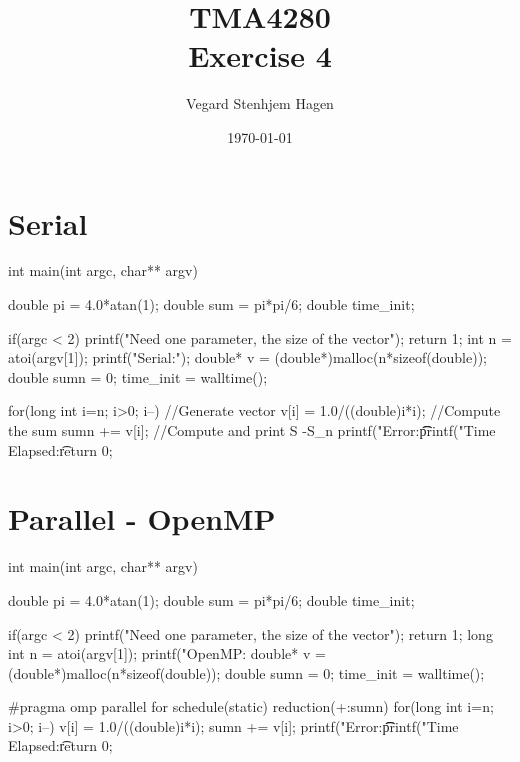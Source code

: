 \documentclass[11pt,a4paper,english]{article}
\title{TMA4280\\Exercise 4}
\author{Vegard Stenhjem Hagen}
\date{\today}
\begin{document}

\maketitle

\section{Serial}

\begin{ccode}
int main(int argc, char** argv){
    double pi = 4.0*atan(1);
    double sum = pi*pi/6;
    double time_init;

    if(argc < 2) {
        printf("Need one parameter, the size of the vector\n");
        return 1;
    }
    int n = atoi(argv[1]);
    printf("Serial:\n");
    double* v = (double*)malloc(n*sizeof(double));
    double sumn = 0;
    time_init = walltime();

    for(long int i=n; i>0; i--){
        //Generate vector
        v[i] = 1.0/((double)i*i);
        //Compute the sum
        sumn += v[i];
    }
    //Compute and print S -S_n
    printf("Error:\t\t %
    printf("Time Elapsed:\t %
	return 0;
}
\end{ccode}

\section{Parallel - OpenMP}
\begin{ccode}
int main(int argc, char** argv){
    double pi = 4.0*atan(1);
    double sum = pi*pi/6;
    double time_init;

    if(argc < 2) {
        printf("Need one parameter, the size of the vector\n");
        return 1;
    }
    long int n = atoi(argv[1]);
    printf("OpenMP\tThreadcount: %
    double* v = (double*)malloc(n*sizeof(double));
    double sumn = 0;
    time_init = walltime();

#pragma omp parallel for schedule(static) reduction(+:sumn)
    for(long int i=n; i>0; i--){
        v[i] = 1.0/((double)i*i);
        sumn += v[i];
    }
    printf("Error:\t\t %
    printf("Time Elapsed:\t %
    return 0;
}
\end{ccode}
\end{document}
